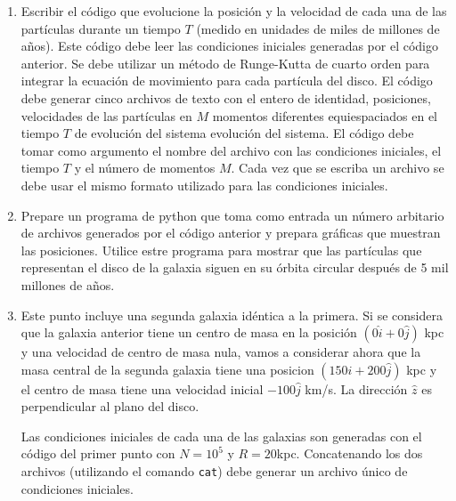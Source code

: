 \documentclass{article}
\begin{document}
\begin{enumerate}
\begin{enumerate}
  Para las cantidades de entrada las unidades son $M_{\odot}$,
  distancias en kpc y velocidades en km/s. 

  Estas condiciones iniciales (posiciones y velocidades) deben ser
  escritas en un archivo de texto al momento de ejecutar el
  c\'odigo. En este archivo la primera columna ser\'a un entero que
  llamaremos ID y corresponde a un n\'umero entero de cada
  part\'icula. El ID es negativo si se trata de la part\'icula
  central, y positivo si se trata de las part\'iculas en las \'orbitas
  circulares. 

\item 
  Escribir el c\'odigo que evolucione la posici\'on y la velocidad de
  cada una de las part\'iculas durante un tiempo $T$ (medido en
  unidades de miles de millones de a\~nos).  Este c\'odigo debe leer
  las condiciones iniciales generadas por el c\'odigo anterior. Se
  debe utilizar un m\'etodo de Runge-Kutta de cuarto orden para
  integrar la ecuaci\'on de movimiento para cada part\'icula del
  disco.  El c\'odigo debe generar cinco archivos 
  de texto con el entero de identidad, posiciones, velocidades de las
  part\'iculas en $M$ momentos diferentes equiespaciados en el tiempo
  $T$ de evoluci\'on del sistema
  evoluci\'on del sistema. El c\'odigo debe tomar como argumento el
  nombre del archivo con las condiciones iniciales, el tiempo $T$ y el
  n\'umero de momentos $M$. Cada vez que se escriba un archivo se debe
  usar el mismo formato utilizado para las condiciones iniciales.

\item 
  Prepare un programa de python que toma como entrada un n\'umero arbitario de 
  archivos generados por el c\'odigo anterior y prepara gr\'aficas que
  muestran las posiciones.  Utilice estre programa para mostrar que
  las part\'iculas que representan el disco de la galaxia siguen en su
  \'orbita circular despu\'es de 5 mil millones de a\~nos. 
  
\item 
  Este punto incluye una segunda galaxia id\'entica a la
  primera. Si se considera que la galaxia anterior tiene un centro de
  masa en la posici\'on $(0\hat{i}+0\hat{j})$ kpc y una velocidad de centro de
  masa nula, vamos a considerar ahora que la masa central de la
  segunda galaxia tiene una posicion $(150\hat{i}+200\hat{j})$ kpc y
  el centro de masa  tiene una velocidad inicial $-100\hat{j}$ km/s. La
  direcci\'on $\hat{z}$ es perpendicular al plano del disco. 

  Las condiciones iniciales de cada una de las galaxias son generadas
  con el c\'odigo del primer punto con $N=10^5$ y
  $R=20$kpc. Concatenando los dos archivos (utilizando el comando
  \verb"cat") debe generar un archivo \'unico de condiciones iniciales.
  

\end{enumerate}
\end{enumerate}
\end{document}

